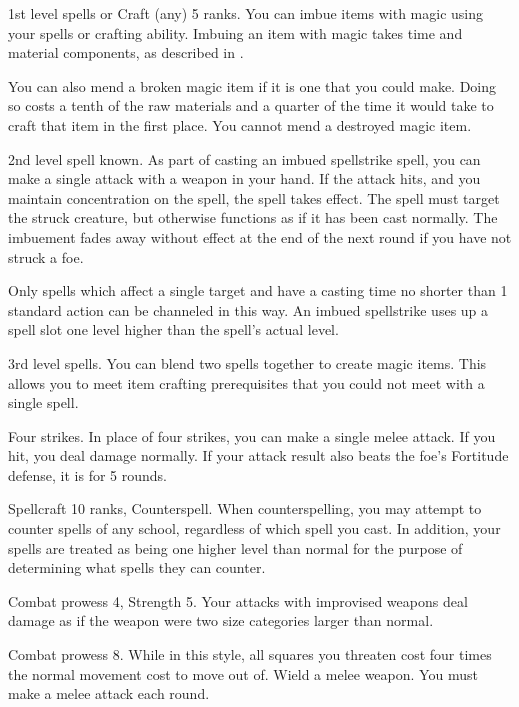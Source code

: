 \featpre 1st level spells or Craft (any) 5 ranks.
\featben You can imbue items with magic using your spells or crafting ability.
Imbuing an item with magic takes time and material components, as described in .

You can also mend a broken magic item if it is one that you could make.
Doing so costs a tenth of the raw materials and a quarter of the time it would take to craft that item in the first place.
You cannot mend a destroyed magic item.

\featpre 2nd level spell known.
\featben As part of casting an imbued spellstrike spell, you can make a single attack with a weapon in your hand.
If the attack hits, and you maintain concentration on the spell, the spell takes effect.
The spell must target the struck creature, but otherwise functions as if it has been cast normally.
The imbuement fades away without effect at the end of the next round if you have not struck a foe.

Only spells which affect a single target and have a casting time no shorter than 1 standard action can be channeled in this way.
An imbued spellstrike uses up a spell slot one level higher than the spell's actual level.

\featpre 3rd level spells.
\featben You can blend two spells together to create magic items.
This allows you to meet item crafting prerequisites that you could not meet with a single spell.

\featpre Four strikes.
\featben In place of four strikes, you can make a single melee attack.
If you hit, you deal damage normally.
If your attack result also beats the foe's Fortitude defense, it is \immobilized for 5 rounds.

\featpres Spellcraft 10 ranks, Counterspell.
\featben When counterspelling, you may attempt to counter spells of any school, regardless of which spell you cast.
In addition, your spells are treated as being one higher level than normal for the purpose of determining what spells they can counter.

\featpres Combat prowess 4, Strength 5.
\featben Your attacks with improvised weapons deal damage as if the weapon were two size categories larger than normal.

\featpre Combat prowess 8.
\featben While in this style, all squares you threaten cost four times the normal movement cost to move out of.
\stylereq Wield a melee weapon.
You must make a melee attack each round.

